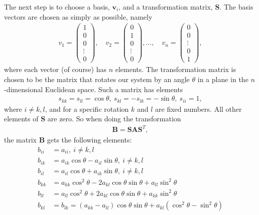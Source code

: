 \documentclass[12pt, a4paper]{article}
\begin{document}
The next step is to choose a basis, $\mathbf{v}_i$, and a transformation matrix, $\mathbf{S}$. The basis 
vectors are chosen as simply as possible, namely 
\begin{align*}
v_1 = \left( \begin{array}{c}
1 \\ 0 \\ 0 \\ \vdots \\ 0
\end{array} \right), \quad 
v_2 = \left( \begin{array}{c}
0 \\ 1 \\ 0 \\ \vdots \\ 0
\end{array} \right), \dots, \quad
v_n = \left( \begin{array}{c}
0 \\ 0 \\ \vdots \\ 0 \\ 1
\end{array} \right),  
\end{align*}
where each vector (of course) has $n$ elements. The transformation matrix is chosen to be the matrix that 
rotates our system by an angle $\theta$ in a plane in the $n$-dimensional Euclidean space. Such a matrix 
has elements 
\begin{align*}
s_{kk} = s_{ll} = \cos\theta, \: s_{kl} = - s_{lk} = -\sin\theta, \: s_{ii} = 1, 
\end{align*}   
where $i \neq k,l$, and for a specific rotation $k$ and $l$ are fixed numbers. All other elements of 
$\mathbf{S}$ are zero. So when doing the transformation 
\begin{align*}
\mathbf{B} = \mathbf{SAS}^T, 
\end{align*}   
the matrix $\mathbf{B}$ gets the following elements: 
\begin{align*}
b_{ii} & = a_{ii},\: i\neq k,l \\
b_{ik} & = a_{ik}\cos\theta - a_{il}\sin\theta, \: i\neq k,l \\
b_{il} & = a_{il}\cos\theta + a_{ik}\sin\theta, \: i\neq k,l \\
b_{kk} & = a_{kk}\cos^2\theta -2a_{kl}\cos\theta\sin\theta + a_{ll}\sin^2\theta \\
b_{ll} & = a_{ll}\cos^2\theta +2a_{kl}\cos\theta\sin\theta + a_{kk}\sin^2\theta \\
b_{kl} & = b_{lk} = (a_{kk} - a_{ll})\cos\theta\sin\theta + a_{kl}(\cos^2\theta - \sin^2\theta)
\end{align*}  
\end{document}
